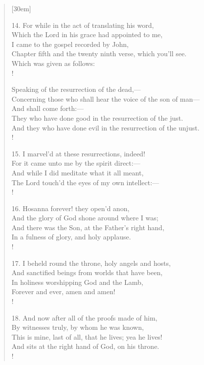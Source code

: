 \begin{verse}[30em]
\begin{altverse}
				14. For while in the act of translating his word, \\ 
				Which the Lord in his grace had appointed to me, \\ 
				I came to the gospel recorded by John, \\ 
				Chapter fifth and the twenty ninth verse, which you'll see. \\ 
				Which was given as follows: \\!
				
			\end{altverse}
				
				Speaking of the resurrection of the dead,--- \\ 
				Concerning those who shall hear the voice of the son of man--- \\ 
				And shall come forth:--- \\ 
				They who have done good in the resurrection of the just. \\ 
				And they who have done evil in the resurrection of the unjust. \\!
				
			\begin{altverse}
				
				15. I marvel'd at these resurrections, indeed! \\ 
				For it came unto me by the spirit direct:--- \\ 
				And while I did meditate what it all meant, \\ 
				The Lord touch'd the eyes of my own intellect:--- \\!
				 
				16. Hosanna forever! they open'd anon, \\ 
				And the glory of God shone around where I was; \\ 
				And there was the Son, at the Father's right hand, \\ 
				In a fulness of glory, and holy applause. \\!
				 
				17. I beheld round the throne, holy angels and hosts, \\ 
				And sanctified beings from worlds that have been, \\ 
				In holiness worshipping God and the Lamb, \\ 
				Forever and ever, amen and amen! \\!
				
				18. And now after all of the proofs made of him, \\ 
				By witnesses truly, by whom he was known, \\ 
				This is mine, last of all, that he lives; yea he lives! \\ 
				And sits at the right hand of God, on his throne. \\!
				 

\end{altverse}
\end{verse}
